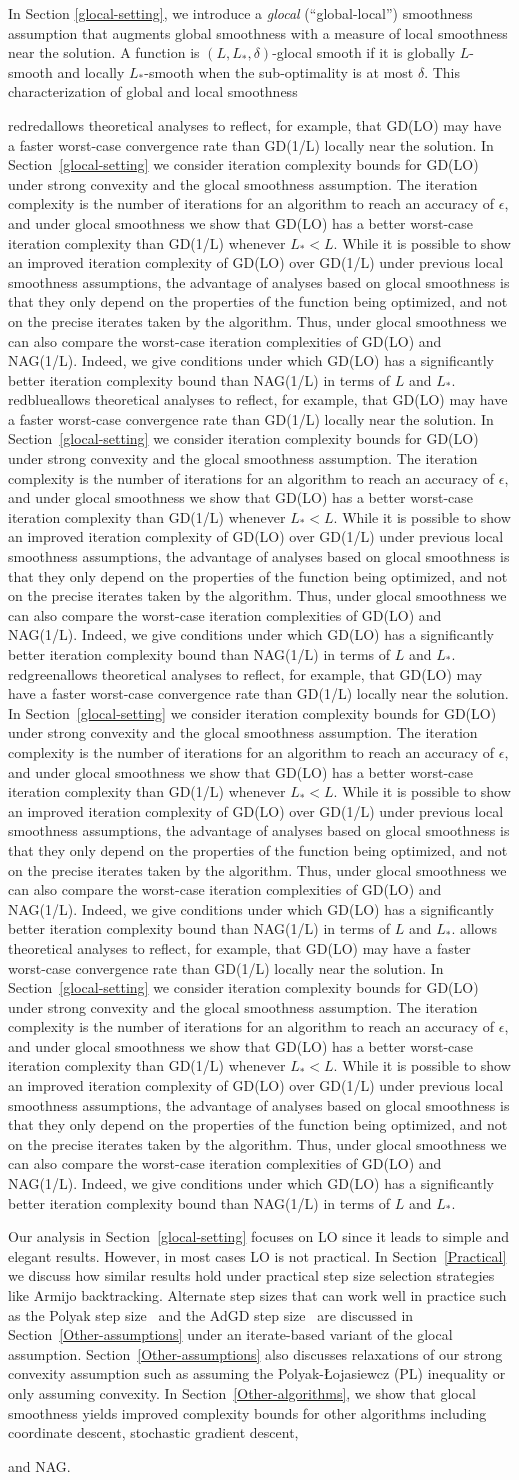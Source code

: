 \documentclass[10pt]{article} %
\newif\ifextended
\newif\ifshowcolours
\def\red{red}
\def\blue{blue}
\def\green{green}
\renewcommand{\textcolor}[2]{%
  \ifshowcolours
    {\color{#1}#2}%
  \else
    \def\temp{#1}%
    \ifx\temp\red     #2\else
    \ifx\temp\blue    #2\else
    \ifx\temp\green   #2\else
        {\color{#1}#2}%
    \fi\fi\fi
  \fi
}
\begin{document}
In Section \ref{glocal-setting}, we introduce a \emph{glocal} (``global-local'') smoothness assumption that augments global smoothness with a measure of local smoothness near the solution. A function is $(L,L_*,\delta)$-glocal smooth if it is globally $L$-smooth and locally $L_*$-smooth when the sub-optimality is at most $\delta$. This characterization of global and local smoothness \textcolor{red}{allows theoretical analyses to reflect, for example, that GD(LO) may have a faster worst-case convergence rate than GD(1/L) locally near the solution. 
In Section~\ref{glocal-setting} we consider iteration complexity bounds for GD(LO) under strong convexity and the glocal smoothness assumption. The iteration complexity is the number of iterations for an algorithm to reach an accuracy of $\epsilon$, and under glocal smoothness we show that GD(LO) has a better worst-case iteration complexity than GD(1/L) whenever $L_* < L$. While it is possible to show an improved iteration complexity of GD(LO) over GD(1/L) under previous local smoothness assumptions, the advantage of analyses based on glocal smoothness is that they only depend on the properties of the function being optimized, and not on the precise iterates taken by the algorithm. Thus, under glocal smoothness we can also compare the worst-case iteration complexities of GD(LO) and NAG(1/L). Indeed, we give conditions under which GD(LO) has a significantly better iteration complexity bound than NAG(1/L) in terms of $L$ and $L_*$.}

Our analysis in Section~\ref{glocal-setting} focuses on LO since it leads to simple and elegant results. However, in most cases LO is not practical. In Section~\ref{Practical} we discuss how similar results hold under practical step size selection strategies like Armijo backtracking. Alternate step sizes that can work well in practice such as the Polyak step size~\cite{polyak1987introduction} and the AdGD step size~\cite{MalitskyM20} are discussed in Section~\ref{Other-assumptions} under an iterate-based variant of the glocal assumption. Section~\ref{Other-assumptions} also discusses relaxations of our strong convexity assumption such as assuming the Polyak-\L{}ojasiewcz (PL) inequality or only assuming convexity. In Section~\ref{Other-algorithms}, we show that glocal smoothness yields improved complexity bounds for other algorithms including coordinate descent, stochastic gradient descent, 
\ifextended
NAG, and non-linear conjugate gradient.
\else
and NAG.
\fi
\end{document}
